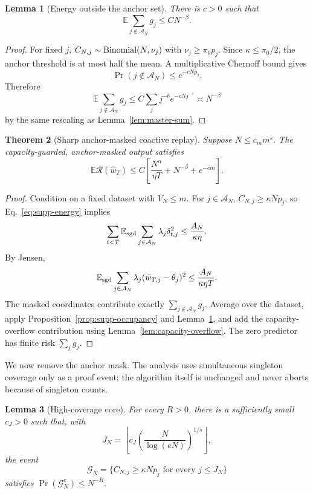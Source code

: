 \documentclass[letterpaper]{article}
\newtheorem{theorem}{Theorem}
\newtheorem{lemma}[theorem]{Lemma}
\newcommand{\E}{\mathbb E}
\newcommand{\R}{\mathcal R}
\newcommand{\cA}{\mathcal A}
\newcommand{\1}{\mathbf 1}
\begin{document}
\begin{lemma}[Energy outside the anchor set]
\label{lem:anchor-tail}
There is $c>0$ such that
\[
\E\sum_{j\notin\cA_N}g_j
\le C N^{-\beta}.
\]
\end{lemma}

\begin{proof}
For fixed $j$, $C_{N,j}\sim{\rm Binomial}(N,\nu_j)$ with
$\nu_j\ge\pi_0p_j$. Since $\kappa\le\pi_0/2$, the anchor threshold is at most
half the mean. A multiplicative Chernoff bound gives
\[
\Pr(j\notin\cA_N)\le e^{-cNp_j}.
\]
Therefore
\[
\E\sum_{j\notin\cA_N}g_j
\le C\sum_jj^{-b}e^{-cNj^{-s}}
\asymp N^{-\beta}
\]
by the same rescaling as Lemma~\ref{lem:master-sum}.
\end{proof}

\begin{theorem}[Sharp anchor-masked coactive replay]
\label{thm:supp-anchor}
Suppose $N\le c_mm^s$. The capacity-guarded, anchor-masked output satisfies
\[
\E\R(\widehat w_T)
\le C\left[
\frac{N^\alpha}{\eta T}+N^{-\beta}+e^{-cm}
\right].
\]
\end{theorem}

\begin{proof}
Condition on a fixed dataset with $V_N\le m$. For $j\in\cA_N$,
$C_{N,j}\ge\kappa Np_j$, so Eq.~\eqref{eq:supp-energy} implies
\[
\sum_{t<T}\E_{\rm sgd}
\sum_{j\in\cA_N}\lambda_j\delta_{t,j}^2
\le\frac{A_N}{\kappa\eta}.
\]
By Jensen,
\[
\E_{\rm sgd}
\sum_{j\in\cA_N}\lambda_j
(\bar w_{T,j}-\theta_j)^2
\le\frac{A_N}{\kappa\eta T}.
\]
The masked coordinates contribute exactly
$\sum_{j\notin\cA_N}g_j$. Average over the dataset, apply
Proposition~\ref{prop:supp-occupancy} and
Lemma~\ref{lem:anchor-tail}, and add the capacity-overflow contribution using
Lemma~\ref{lem:capacity-overflow}. The zero predictor has finite risk
$\sum_jg_j$.
\end{proof}

We now remove the anchor mask. The analysis uses simultaneous singleton
coverage only as a proof event; the algorithm itself is unchanged and never
aborts because of singleton counts.

\begin{lemma}[High-coverage core]
\label{lem:core-event}
For every $R>0$, there is a sufficiently small $c_J>0$ such that, with
\[
J_N=\left\lfloor c_J
\left(\frac{N}{\log(eN)}\right)^{1/s}\right\rfloor,
\]
the event
\[
\mathcal G_N=\{C_{N,j}\ge\kappa Np_j\text{ for every }j\le J_N\}
\]
satisfies $\Pr(\mathcal G_N^c)\le N^{-R}$.
\end{lemma}
\end{document}
